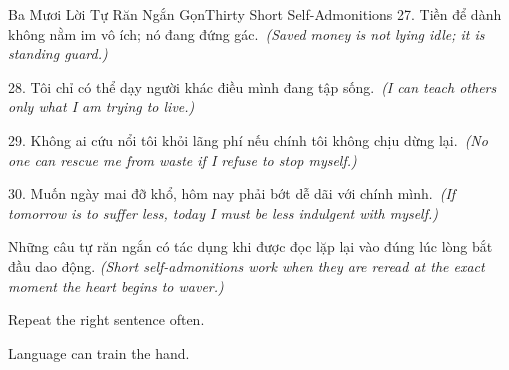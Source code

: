 \begin{truyen}{Ba Mươi Lời Tự Răn Ngắn Gọn}{Thirty Short Self-Admonitions}
27. Tiền để dành không nằm im vô ích; nó đang đứng gác.\
\textit{(Saved money is not lying idle; it is standing guard.)}

28. Tôi chỉ có thể dạy người khác điều mình đang tập sống.\
\textit{(I can teach others only what I am trying to live.)}

29. Không ai cứu nổi tôi khỏi lãng phí nếu chính tôi không chịu dừng lại.\
\textit{(No one can rescue me from waste if I refuse to stop myself.)}

30. Muốn ngày mai đỡ khổ, hôm nay phải bớt dễ dãi với chính mình.\
\textit{(If tomorrow is to suffer less, today I must be less indulgent with myself.)}
\end{truyen}

\begin{baihoc}
Những câu tự răn ngắn có tác dụng khi được đọc lặp lại vào đúng lúc lòng bắt đầu dao động.
\textit{(Short self-admonitions work when they are reread at the exact moment the heart begins to waver.)}
\end{baihoc}

\begin{ghinhoanh}
Repeat the right sentence often.

Language can train the hand.
\end{ghinhoanh}

\ngancach